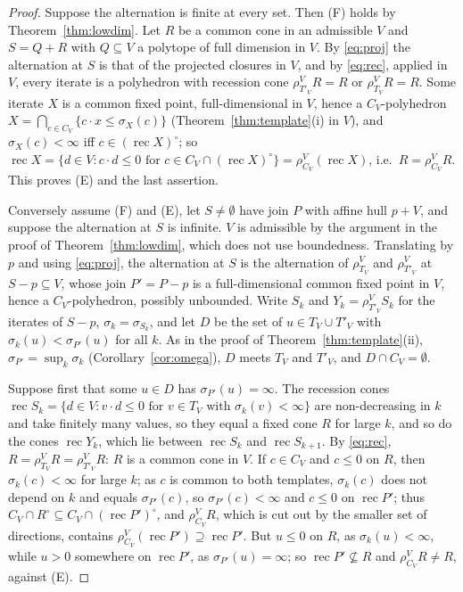 \documentclass[11pt]{amsart}
\theoremstyle{definition}
\newcommand{\rec}{\operatorname{rec}}
\begin{document}
\begin{proof}
Suppose the alternation is finite at every set. Then (F) holds by
Theorem~\ref{thm:lowdim}. Let $R$ be a common cone in an admissible $V$
and $S=Q+R$ with $Q\subseteq V$ a polytope of full dimension in $V$.
By \eqref{eq:proj} the alternation at $S$ is that of the projected
closures in $V$, and by \eqref{eq:rec}, applied in $V$, every iterate
is a polyhedron with recession cone $\rho^V_{T'_V}R=R$ or $\rho^V_{T_V}
R=R$. Some iterate $X$ is a common fixed point, full-dimensional in
$V$, hence a $C_V$-polyhedron $X=\bigcap_{c\in C_V}\{c\cdot x\le
\sigma_X(c)\}$ (Theorem~\ref{thm:template}(i) in $V$), and $\sigma_X(c)
<\infty$ iff $c\in(\rec X)^\circ$; so $\rec X=\{d\in V:c\cdot d\le0
\text{ for }c\in C_V\cap(\rec X)^\circ\}=\rho^V_{C_V}(\rec X)$, i.e.\
$R=\rho^V_{C_V}R$. This proves (E) and the last assertion.

Conversely assume (F) and (E), let $S\ne\emptyset$ have join $P$ with
affine hull $p+V$, and suppose the alternation at $S$ is infinite. $V$
is admissible by the argument in the proof of
Theorem~\ref{thm:lowdim}, which does not use boundedness. Translating
by $p$ and using \eqref{eq:proj}, the alternation at $S$ is the
alternation of $\rho^V_{T_V}$ and $\rho^V_{T'_V}$ at $S-p\subseteq V$,
whose join $P'=P-p$ is a full-dimensional common fixed point in $V$,
hence a $C_V$-polyhedron, possibly unbounded. Write $S_k$ and $Y_k=
\rho^V_{T'_V}S_k$ for the iterates of $S-p$, $\sigma_k=\sigma_{S_k}$,
and let $D$ be the set of $u\in T_V\cup T'_V$ with $\sigma_k(u)<
\sigma_{P'}(u)$ for all $k$. As in the proof of
Theorem~\ref{thm:template}(ii), $\sigma_{P'}=\sup_k\sigma_k$
(Corollary~\ref{cor:omega}), $D$ meets $T_V$ and $T'_V$, and $D\cap
C_V=\emptyset$.

Suppose first that some $u\in D$ has $\sigma_{P'}(u)=\infty$. The
recession cones $\rec S_k=\{d\in V:v\cdot d\le0\text{ for }v\in T_V
\text{ with }\sigma_k(v)<\infty\}$ are non-decreasing in $k$ and take
finitely many values, so they equal a fixed cone $R$ for large $k$, and
so do the cones $\rec Y_k$, which lie between $\rec S_k$ and $\rec
S_{k+1}$. By \eqref{eq:rec}, $R=\rho^V_{T_V}R=\rho^V_{T'_V}R$: $R$ is a
common cone in $V$. If $c\in C_V$ and $c\le0$ on $R$, then $\sigma_k(c)
<\infty$ for large $k$; as $c$ is common to both templates, $\sigma_k
(c)$ does not depend on $k$ and equals $\sigma_{P'}(c)$, so
$\sigma_{P'}(c)<\infty$ and $c\le0$ on $\rec P'$; thus $C_V\cap R^\circ\subseteq C_V\cap(\rec P')^
\circ$, and $\rho^V_{C_V}R$, which is cut out by the smaller set of
directions, contains $\rho^V_{C_V}(\rec P')\supseteq\rec P'$. But $u\le
0$ on $R$, as $\sigma_k(u)<\infty$, while $u>0$ somewhere on $\rec P'$,
as $\sigma_{P'}(u)=\infty$; so $\rec P'\not\subseteq R$ and $\rho^V_{C_V}
R\ne R$, against (E).


\end{proof}
\end{document}
